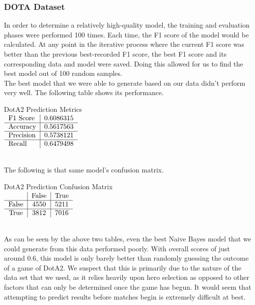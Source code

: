 \documentclass[a4paper,fleqn]{cas-sc}
\begin{document}
\subsubsection{DOTA Dataset}
 In order to determine a relatively high-quality model, the training and evaluation phases were performed 100 times. Each time, the F1 score of the model would be calculated. At any point in the iterative process where the current F1 score was better than the previous best-recorded F1 score, the best F1 score and its corresponding data and model were saved. Doing this allowed for us to find the best model out of 100 random samples.\\
The best model that we were able to generate based on our data didn't perform very well. The following table shows its performance.\\
\begin{center}
DotA2 Prediction Metrics\\
$\begin{tabular}{l|l}
F1 Score & 0.6086315 \\ \hline
Accuracy & 0.5617563 \\ \hline
Precision & 0.5738121 \\ \hline
Recall & 0.6479498 \\
\end{tabular}$
\end{center}\\
The following is that same model's confusion matrix.\\
\begin{center}
DotA2 Prediction Confusion Matrix\\
$\begin{tabular}{c|c|c}
 & False & True \\ \hline
False & 4550 & 5211 \\ \hline
True & 3812 & 7016 \\
\end{tabular}$
\end{center}\\
As can be seen by the above two tables, even the best Naive Bayes model that we could generate from this data performed poorly. With overall scores of just around 0.6, this model is only barely better than randomly guessing the outcome of a game of DotA2. We suspect that this is primarily due to the nature of the data set that we used, as it relies heavily upon hero selection as opposed to other factors that can only be determined once the game has begun. It would seem that attempting to predict results before matches begin is extremely difficult at best.\\
\end{document}
